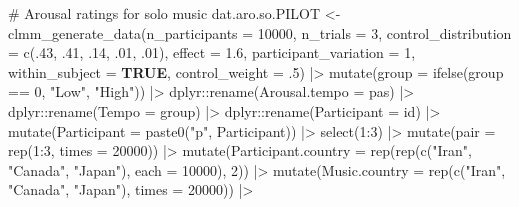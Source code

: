 \documentclass[
  bookmarksnumbered]{article}
\newenvironment{Shaded}{\begin{snugshade}}{\end{snugshade}}
\newcommand{\AttributeTok}[1]{\textcolor[rgb]{0.80,0.80,0.80}{#1}}
\newcommand{\CommentTok}[1]{\textcolor[rgb]{0.50,0.62,0.50}{#1}}
\newcommand{\ConstantTok}[1]{\textcolor[rgb]{0.86,0.64,0.64}{\textbf{#1}}}
\newcommand{\DecValTok}[1]{\textcolor[rgb]{0.86,0.86,0.80}{#1}}
\newcommand{\FloatTok}[1]{\textcolor[rgb]{0.75,0.75,0.82}{#1}}
\newcommand{\FunctionTok}[1]{\textcolor[rgb]{0.94,0.94,0.56}{#1}}
\newcommand{\NormalTok}[1]{\textcolor[rgb]{0.80,0.80,0.80}{#1}}
\newcommand{\OtherTok}[1]{\textcolor[rgb]{0.94,0.94,0.56}{#1}}
\newcommand{\SpecialCharTok}[1]{\textcolor[rgb]{0.86,0.64,0.64}{#1}}
\newcommand{\StringTok}[1]{\textcolor[rgb]{0.80,0.58,0.58}{#1}}
\begin{document}
\begin{Shaded}
\begin{Highlighting}[]
\CommentTok{\# Arousal ratings for solo music}
\NormalTok{dat.aro.so.PILOT }\OtherTok{\textless{}{-}} \FunctionTok{clmm\_generate\_data}\NormalTok{(}\AttributeTok{n\_participants =} \DecValTok{10000}\NormalTok{,}
                                 \AttributeTok{n\_trials =} \DecValTok{3}\NormalTok{,}
                                 \AttributeTok{control\_distribution =} \FunctionTok{c}\NormalTok{(.}\DecValTok{43}\NormalTok{, .}\DecValTok{41}\NormalTok{, .}\DecValTok{14}\NormalTok{, .}\DecValTok{01}\NormalTok{, .}\DecValTok{01}\NormalTok{),}
                                 \AttributeTok{effect =} \FloatTok{1.6}\NormalTok{,}
                                 \AttributeTok{participant\_variation =} \DecValTok{1}\NormalTok{,}
                                 \AttributeTok{within\_subject =} \ConstantTok{TRUE}\NormalTok{,}
                                 \AttributeTok{control\_weight =}\NormalTok{ .}\DecValTok{5}\NormalTok{) }\SpecialCharTok{|\textgreater{}}
  \FunctionTok{mutate}\NormalTok{(}\AttributeTok{group =} \FunctionTok{ifelse}\NormalTok{(group }\SpecialCharTok{==} \DecValTok{0}\NormalTok{, }\StringTok{"Low"}\NormalTok{, }\StringTok{"High"}\NormalTok{)) }\SpecialCharTok{|\textgreater{}}
\NormalTok{  dplyr}\SpecialCharTok{::}\FunctionTok{rename}\NormalTok{(}\AttributeTok{Arousal.tempo =}\NormalTok{ pas) }\SpecialCharTok{|\textgreater{}}
\NormalTok{  dplyr}\SpecialCharTok{::}\FunctionTok{rename}\NormalTok{(}\AttributeTok{Tempo =}\NormalTok{ group) }\SpecialCharTok{|\textgreater{}}
\NormalTok{  dplyr}\SpecialCharTok{::}\FunctionTok{rename}\NormalTok{(}\AttributeTok{Participant =}\NormalTok{ id) }\SpecialCharTok{|\textgreater{}}
  \FunctionTok{mutate}\NormalTok{(}\AttributeTok{Participant =} \FunctionTok{paste0}\NormalTok{(}\StringTok{"p"}\NormalTok{, Participant)) }\SpecialCharTok{|\textgreater{}}
  \FunctionTok{select}\NormalTok{(}\DecValTok{1}\SpecialCharTok{:}\DecValTok{3}\NormalTok{) }\SpecialCharTok{|\textgreater{}}
  \FunctionTok{mutate}\NormalTok{(}\AttributeTok{pair =} \FunctionTok{rep}\NormalTok{(}\DecValTok{1}\SpecialCharTok{:}\DecValTok{3}\NormalTok{, }\AttributeTok{times =} \DecValTok{20000}\NormalTok{)) }\SpecialCharTok{|\textgreater{}}
  \FunctionTok{mutate}\NormalTok{(}\AttributeTok{Participant.country =} \FunctionTok{rep}\NormalTok{(}\FunctionTok{rep}\NormalTok{(}\FunctionTok{c}\NormalTok{(}\StringTok{"Iran"}\NormalTok{, }\StringTok{"Canada"}\NormalTok{, }\StringTok{"Japan"}\NormalTok{), }\AttributeTok{each =} \DecValTok{10000}\NormalTok{), }\DecValTok{2}\NormalTok{)) }\SpecialCharTok{|\textgreater{}}
  \FunctionTok{mutate}\NormalTok{(}\AttributeTok{Music.country =} \FunctionTok{rep}\NormalTok{(}\FunctionTok{c}\NormalTok{(}\StringTok{"Iran"}\NormalTok{, }\StringTok{"Canada"}\NormalTok{, }\StringTok{"Japan"}\NormalTok{), }\AttributeTok{times =} \DecValTok{20000}\NormalTok{)) }\SpecialCharTok{|\textgreater{}}

\end{Highlighting}
\end{Shaded}
\end{document}
